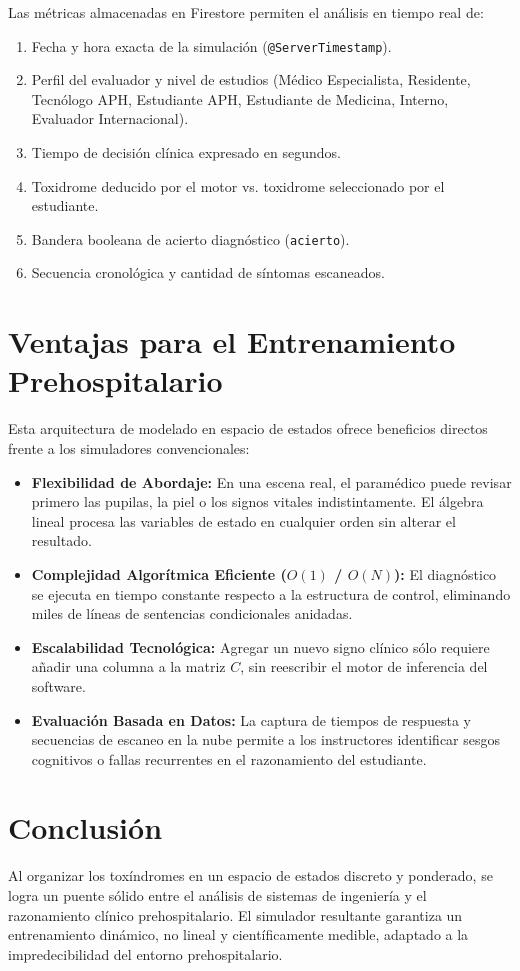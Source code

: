 \documentclass[conference,10pt,a4paper]{IEEEtran}
\begin{document}
Las métricas almacenadas en Firestore permiten el análisis en tiempo real de:
\begin{enumerate}
    \item Fecha y hora exacta de la simulación (\texttt{@ServerTimestamp}).
    \item Perfil del evaluador y nivel de estudios (Médico Especialista, Residente, Tecnólogo APH, Estudiante APH, Estudiante de Medicina, Interno, Evaluador Internacional).
    \item Tiempo de decisión clínica expresado en segundos.
    \item Toxidrome deducido por el motor vs. toxidrome seleccionado por el estudiante.
    \item Bandera booleana de acierto diagnóstico (\texttt{acierto}).
    \item Secuencia cronológica y cantidad de síntomas escaneados.
\end{enumerate}

\section{Ventajas para el Entrenamiento Prehospitalario}
Esta arquitectura de modelado en espacio de estados ofrece beneficios directos frente a los simuladores convencionales:
\begin{itemize}
    \item \textbf{Flexibilidad de Abordaje:} En una escena real, el paramédico puede revisar primero las pupilas, la piel o los signos vitales indistintamente. El álgebra lineal procesa las variables de estado en cualquier orden sin alterar el resultado.
    \item \textbf{Complejidad Algorítmica Eficiente ($O(1)$ / $O(N)$):} El diagnóstico se ejecuta en tiempo constante respecto a la estructura de control, eliminando miles de líneas de sentencias condicionales anidadas.
    \item \textbf{Escalabilidad Tecnológica:} Agregar un nuevo signo clínico sólo requiere añadir una columna a la matriz $C$, sin reescribir el motor de inferencia del software.
    \item \textbf{Evaluación Basada en Datos:} La captura de tiempos de respuesta y secuencias de escaneo en la nube permite a los instructores identificar sesgos cognitivos o fallas recurrentes en el razonamiento del estudiante.
\end{itemize}

\section{Conclusión}
Al organizar los toxíndromes en un espacio de estados discreto y ponderado, se logra un puente sólido entre el análisis de sistemas de ingeniería y el razonamiento clínico prehospitalario. El simulador resultante garantiza un entrenamiento dinámico, no lineal y científicamente medible, adaptado a la impredecibilidad del entorno prehospitalario.
\end{document}

